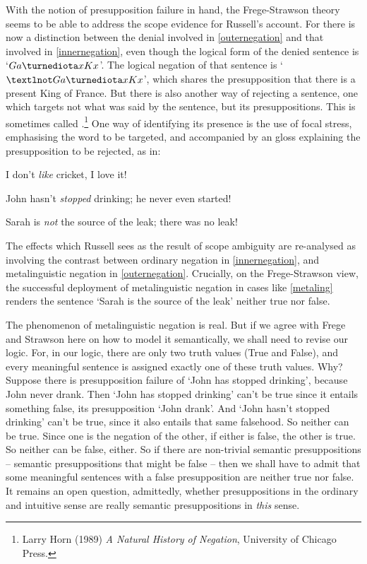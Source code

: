 With the notion of presupposition failure in hand, the Frege-Strawson theory seems to be able to address the scope evidence for Russell's account. For there is now a distinction between the denial involved in \ref{outernegation} and that involved in \ref{innernegation}, even though the logical form of the denied sentence is `$Ga\maththe x Kx$'. The logical negation of that sentence is `$¬Ga\maththe x Kx$', which shares the presupposition that there is a present King of France. But there is also another way of rejecting a sentence, one which targets not what was said by the sentence, but its presuppositions. This is sometimes called .\footnote{Larry Horn (1989) \emph{A Natural History of Negation}, University of Chicago Press.} One way of identifying its presence is the use of focal stress, emphasising the word to be targeted, and accompanied by an gloss explaining the presupposition to be rejected, as in:
\begin{earg}
\item[\ex{likelove}] I don't \emph{like} cricket, I love it!
\item[\ex{neverstarted}] John hasn't \emph{stopped} drinking; he never even started!
\item[\ex{metaling}] Sarah is \emph{not} the source of the leak; there was no leak!
\end{earg} The effects which Russell sees as the result of scope ambiguity are re-analysed as involving the contrast between ordinary negation in \ref{innernegation}, and metalinguistic negation in \ref{outernegation}. Crucially, on the Frege-Strawson view, the successful deployment of metalinguistic negation in cases like \ref{metaling} renders the sentence `Sarah is the source of the leak' neither true nor false.

The phenomenon of metalinguistic negation is real. But if we agree with Frege and Strawson here on how to model it semantically,  we shall need to revise our logic. For, in our logic, there are only two truth values (True and False), and every meaningful sentence is assigned exactly one of these truth values. Why? Suppose there is presupposition failure of `John has stopped drinking', because John never drank. Then `John has stopped drinking' can't be true since it entails something false, its presupposition `John drank'. And `John hasn't stopped drinking' can't be true, since it also entails that same falsehood. So neither can be true. Since one is the negation of the other, if either is false, the other is true. So neither can be false, either. So if there are non-trivial semantic presuppositions – semantic presuppositions that might be false – then we shall have to admit that some meaningful sentences with a false presupposition are neither true nor false. It remains an open question, admittedly, whether presuppositions in the ordinary and intuitive sense are really semantic presuppositions in \emph{this} sense. 

